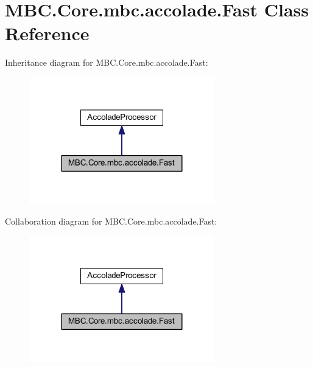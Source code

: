 \hypertarget{class_m_b_c_1_1_core_1_1mbc_1_1accolade_1_1_fast}{\section{M\-B\-C.\-Core.\-mbc.\-accolade.\-Fast Class Reference}
\label{class_m_b_c_1_1_core_1_1mbc_1_1accolade_1_1_fast}
}


Inheritance diagram for M\-B\-C.\-Core.\-mbc.\-accolade.\-Fast\-:\nopagebreak
\begin{figure}[H]
\begin{center}
\leavevmode
\includegraphics[width=228pt]{class_m_b_c_1_1_core_1_1mbc_1_1accolade_1_1_fast__inherit__graph}
\end{center}
\end{figure}


Collaboration diagram for M\-B\-C.\-Core.\-mbc.\-accolade.\-Fast\-:\nopagebreak
\begin{figure}[H]
\begin{center}
\leavevmode
\includegraphics[width=228pt]{class_m_b_c_1_1_core_1_1mbc_1_1accolade_1_1_fast__coll__graph}
\end{center}
\end{figure}
